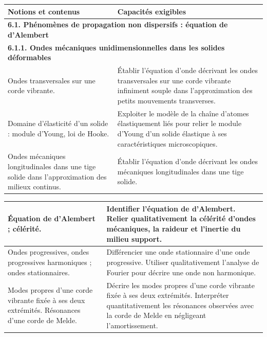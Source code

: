 {\scriptsize
        \begin{tabularx}{0.55\textwidth}{|p{}|X|}
            \hline 
            \textbf{Notions et contenus} & \textbf{Capacités exigibles} \\
            \hline 
            \multicolumn{2}{|l|}{\textbf{ 6.1. Phénomènes de propagation non dispersifs : équation de d'Alembert }} \\
            \hline
            \multicolumn{2}{|l|}{\textbf{
            6.1.1. Ondes mécaniques unidimensionnelles dans les solides déformables }}\\
            \hline
            Ondes transversales sur une corde vibrante.  & 
            Établir l'équation d'onde décrivant les ondes transversales sur une corde vibrante infiniment souple dans l'approximation des petits mouvements transverses. \\
            \hline 
            Domaine d'élasticité d'un solide : module d'Young, loi de Hooke.   & 
            Exploiter le modèle de la chaîne d'atomes élastiquement liés pour relier le module d'Young d'un solide élastique à ses caractéristiques microscopiques. \\
        \hline 
        Ondes mécaniques longitudinales dans une tige solide dans l'approximation des milieux continus. & 
        Établir l'équation d'onde décrivant les ondes mécaniques longitudinales dans une tige solide. \\ 
        \hline
        \end{tabularx}
        \begin{tabularx}{0.43\textwidth}{|p{}|X|}
            \hline
            Équation de d'Alembert ; célérité.  & 
            Identifier l'équation de d'Alembert. Relier qualitativement la célérité d'ondes mécaniques, la raideur et l'inertie du milieu support. \\
            \hline 
            Ondes progressives, ondes progressives harmoniques ; ondes stationnaires.   & 
            Différencier une onde stationnaire d'une onde progressive.
Utiliser qualitativement l'analyse de Fourier pour décrire une onde non harmonique. \\
        \hline 
        Modes propres d'une corde vibrante fixée à ses deux extrémités. Résonances d'une corde de Melde. & 
        Décrire les modes propres d'une corde vibrante fixée à ses deux extrémités. Interpréter quantitativement les résonances observées avec la corde de Melde en négligeant l'amortissement. \\ 
        \hline
        \end{tabularx}
\vspace{0.5cm}
}
